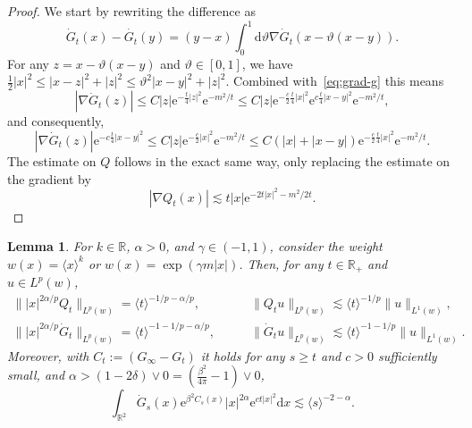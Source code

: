 \documentclass[11pt, a4paper]{scrartcl}
\numberwithin{equation}{section}
\theoremstyle{plain}
\newtheorem{lemma}[foo]{Lemma}
\theoremstyle{remark}
\newcommand{\assign}{:=}
\newcommand{\mathd}{\mathrm{d}}
\newcommand{\mathe}{\mathrm{e}}
\begin{document}
\begin{proof}
  We start by rewriting the difference as
  \[ \dot{G}_t (x) - \dot{G_t} (y) = (y - x)  \int_0^1 \mathd \vartheta \nabla
     \dot{G}_t (x - \vartheta (x - y)) . \]
  For any $z = x - \vartheta (x - y)$ and $\vartheta \in [0, 1]$, we have
  $\frac{1}{2} | x |^2 \leqslant | x - z |^2 + | z |^2 \leqslant \vartheta^2 |
  x - y |^2 + | z |^2$. Combined with~\eqref{eq:grad-g} this means
  \[ | \nabla \dot{G}_t (z) | \leqslant C | z | \mathe^{- \frac{t}{4}| z |^2} \mathe^{-
     m^2 / t} \leqslant C | z | \mathe^{- \frac{c}{2}  \frac{t}{4}| x |^2} \mathe^{c \frac{t}{4}| x -
     y |^2} \mathe^{- m^2 / t}, \]
  and consequently,
  \[ | \nabla \dot{G}_t (z) | \mathe^{- c \frac{t}{4} | x - y |^2} \leqslant C | z |
     \mathe^{- \frac{c}{2} | x |^2} \mathe^{- m^2 / t} \leqslant C (| x | + |
     x - y |) \mathe^{- \frac{c}{2} \frac{t}{4}| x |^2} \mathe^{- m^2 / t} . \]
  The estimate on $Q$ follows in the exact same way, only replacing the
  estimate on the gradient by
  \[ | \nabla Q_t (x) | \lesssim t | x | \mathe^{- 2 t | x |^2 - m^2 / 2 t} .
  \]
\end{proof}

\begin{lemma}
  \label{lem:hk-exp} \label{lem:hk-scaling}For $k \in \mathbb{R}$, $\alpha >
  0$, and $\gamma \in (- 1, 1)$, consider the weight $w (x) = \langle x \rangle^k$ or $w (x) =
  \exp (\gamma m | x |)$. Then, for any $t \in \mathbb{R}_+$ and $u \in L^p
  (w)$,
  \begin{equation}
    \begin{aligned}
      \| | x |^{2 \alpha / p} Q_t \|_{L^p (w)} = \langle t \rangle^{- 1 / p -
      \alpha / p}, \quad&\quad \| Q_t u \|_{L^p (w)} \lesssim \langle t \rangle^{- 1
      / p} \| u \|_{L^1 (w)},\\
      \| | x |^{2 \alpha / p}  \dot{G}_t \|_{L^p (w)} = \langle t \rangle^{- 1
      - 1 / p - \alpha / p}, \quad&\quad \| \dot{G}_t u \|_{L^p (w)} \lesssim \langle
      t \rangle^{- 1 - 1 / p} \| u \|_{L^1 (w)}.
    \end{aligned}\label{eq:QLp}
  \end{equation}
  Moreover, with $C_t \assign (G_{\infty} - G_t)$ it holds for any $s
  \geqslant t$ and $c > 0$ sufficiently small, and $\alpha > (1 - 2 \delta)
  \vee 0 = \left( \frac{\beta^2}{4 \pi} - 1 \right) \vee 0$,
  \begin{equation}
    \int_{\mathbb{R}^2} \dot{G}_s (x) \mathe^{\beta^2 C_s (x)} | x |^{2
    \alpha} \mathe^{c t | x |^2} \mathd x \lesssim \langle s \rangle^{- 2 -
    \alpha} . \label{eq:hk-scaling}
  \end{equation}
\end{lemma}
\end{document}
